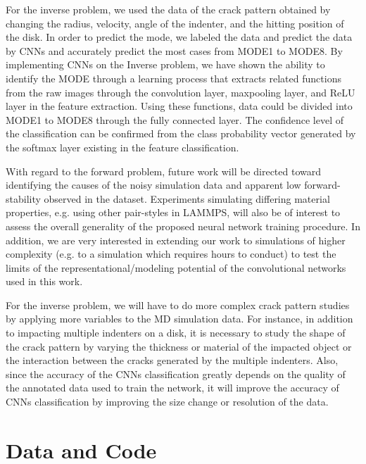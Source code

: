 For the inverse problem, we used the data of the crack pattern obtained by changing the radius, velocity, angle of the indenter, and the hitting position of the disk. In order to predict the mode, we labeled the data and predict the data by CNNs and accurately predict the most cases from MODE1 to MODE8. By implementing CNNs on the Inverse problem, we have shown the ability to identify the MODE through a learning process that extracts related functions from the raw images through the convolution layer, maxpooling layer, and ReLU layer in the feature extraction. Using these functions, data could be divided into MODE1 to MODE8 through the fully connected layer. The confidence level of the classification can be confirmed from the class probability vector generated by the softmax layer existing in the feature classification. 

With regard to the forward problem, future work will be directed toward identifying the causes of the noisy simulation data and apparent low forward-stability observed in the dataset.  Experiments simulating differing material properties, e.g. using other pair-styles in LAMMPS, will also be of interest to assess the overall generality of the proposed neural network training procedure.  In addition, we are very interested in extending our work to simulations of higher complexity (e.g. to a simulation which requires hours to conduct) to test the limits of the representational/modeling potential of the convolutional networks used in this work.

For the inverse problem, we will have to do more complex crack pattern studies by applying more variables to the MD simulation data. For instance, in addition to impacting multiple indenters on a disk, it is necessary to study the shape of the crack pattern by varying the thickness or material of the impacted object or the interaction between the cracks generated by the multiple indenters. Also, since the accuracy of the CNNs classification greatly depends on the quality of the annotated data used to train the network, it will improve the accuracy of CNNs classification by improving the size change or resolution of the data. 


\section{Data and Code}
\label{sec:6}


